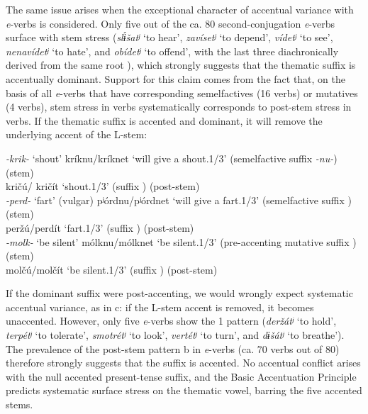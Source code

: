 \documentclass[output=paper,colorlinks,citecolor=black,koreanfont]{langscibook}
\begin{document}
The same issue arises when the exceptional character of accentual variance with \textit{e}-verbs is considered. Only five out of the ca. 80 second-conjugation \textit{e}-verbs surface with stem stress (\textit{slɨ́šatʲ} ‘to hear’, \textit{zavísetʲ} ‘to depend’, \textit{vídetʲ} ‘to see’, \textit{nenavídetʲ} ‘to hate’, and \textit{obídetʲ} ‘to offend’, with the last three diachronically derived from the same root ), which strongly suggests that the thematic suffix  is accentually dominant. Support for this claim comes from the fact that, on the basis of all \textit{e}-verbs that have corresponding semelfactives (16 verbs) or mutatives (4 verbs), stem stress in  verbs systematically corresponds to post-stem stress in  verbs. If the thematic suffix  is accented and dominant, it will remove the underlying accent of the L-stem:

\ea\label{mat:ex:krik} \textit{-krik-} ‘shout’
\ea\label{mat:ex:kriknu} {kríknu}/{kríknet} ‘will give a shout.{1\SG}/{3\SG}’ (semelfactive suffix \textit{-nu-}) \\\hspace*{\fill} (stem)\\
\ex\label{mat:ex:kricu} {kričú}/ {kričít} ‘shout.{1\SG}/{3\SG}’ (suffix ) \hfill (post-stem)\\
\z
\ex\label{mat:ex:perd} \textit{-perd-} ‘fart’ (vulgar)
\ea\label{mat:ex:pjordnu} {pʲórdnu}/{pʲórdnet} ‘will give a fart.{1\SG}/{3\SG}’ (semelfactive suffix ) \hfill (stem)\\
\ex\label{mat:ex:perzu} {peržú}/{perdít} ‘fart.{1\SG}/{3\SG}’ (suffix ) \hfill (post-stem)\\
\z
\ex\label{mat:ex:molk} \textit{-molk-} ‘be silent’
\ea\label{mat:ex:molknu} {mólknu}/{mólknet} ‘be silent.{1\SG}/{3\SG}’ (pre-accenting mutative suffix ) \hfill ({stem})\\
\ex\label{mat:ex:molcu} {molčú}/{molčít} ‘be silent.{1\SG}/{3\SG}’ (suffix ) \hfill ({post-stem})\\
\z
\z

\noindent If the dominant suffix  were post-accenting, we would wrongly expect systematic accentual variance, as in c: if the L-stem accent is removed, it becomes unaccented. However, only five \textit{e}-verbs show the {1\SG} pattern (\textit{deržátʲ} ‘to hold’, \textit{terpétʲ} ‘to tolerate’, \textit{smotrétʲ} ‘to look’, \textit{vertétʲ} ‘to turn’, and \textit{dɨšátʲ} ‘to breathe’). The prevalence of the post-stem pattern b in \textit{e}-verbs (ca. 70 verbs out of 80) therefore strongly suggests that the suffix  is accented. No accentual conflict arises with the null accented present-tense suffix, and the Basic Accentuation Principle  predicts systematic surface stress on the thematic vowel, barring the five accented stems.
\end{document}
